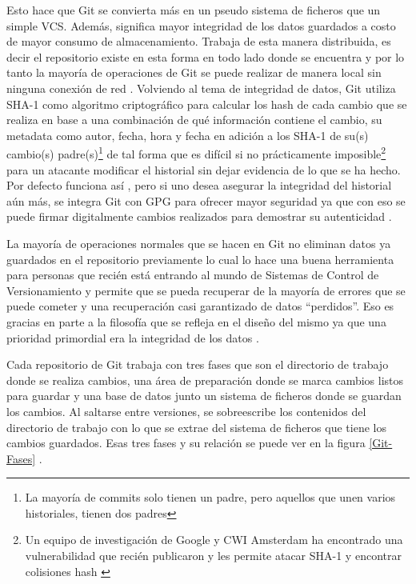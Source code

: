 Esto hace que Git se convierta más en un pseudo sistema de ficheros que un simple VCS. Además, significa mayor integridad de los datos guardados a costo de mayor consumo de almacenamiento. Trabaja de esta manera distribuida, es decir el repositorio existe en esta forma en todo lado donde se encuentra y por lo tanto la mayoría de operaciones de Git se puede realizar de manera local sin ninguna conexión de red \citep{PROGIT-Git-Intro}.
Volviendo al tema de integridad de datos, Git utiliza SHA-1 como algoritmo criptográfico para calcular los hash de cada cambio que se realiza en base a una combinación de qué información contiene el cambio, su metadata como autor, fecha, hora y fecha en adición a los SHA-1 de su(s) cambio(s) padre(s)\footnote{La mayoría de commits solo tienen un padre, pero aquellos que unen varios historiales, tienen dos padres} de tal forma que es difícil si no prácticamente imposible\footnote{Un equipo de investigación de Google y CWI Amsterdam ha encontrado una vulnerabilidad que recién publicaron y les permite atacar SHA-1 y encontrar colisiones hash \citep{Shattered-Paper}} para un atacante modificar el historial sin dejar evidencia de lo que se ha hecho. Por defecto funciona así \citep{PROGIT-Git-Intro}, pero si uno desea asegurar la integridad del historial aún más, se integra Git con GPG para ofrecer mayor seguridad ya que con eso se puede firmar digitalmente cambios realizados para demostrar su autenticidad \citep{PROGIT-Git-GPG}.

La mayoría de operaciones normales  que se hacen en Git no eliminan datos ya guardados en el repositorio previamente lo cual lo hace una buena herramienta para personas que recién está entrando al mundo de Sistemas de Control de Versionamiento y permite que se pueda recuperar de la mayoría de errores que se puede cometer y una recuperación casi garantizado de datos “perdidos”. Eso es gracias en parte a la filosofía que se refleja en el diseño del mismo ya que una prioridad primordial era la integridad de los datos \citep{PROGIT-Git-Intro}.

Cada repositorio de Git trabaja con tres fases que son el directorio de trabajo donde se realiza cambios, una área de preparación donde se marca cambios listos para guardar y una base de datos junto un sistema de ficheros donde se guardan los cambios. Al saltarse entre versiones, se sobreescribe los contenidos del directorio de trabajo con lo que se extrae del sistema de ficheros que tiene los cambios guardados. Esas tres fases y su relación se puede ver en la figura \ref{Git-Fases} \citep{PROGIT-Git-Intro}.

